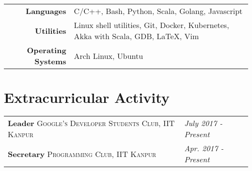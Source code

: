 \documentclass[11pt]{article}
\let\bold\textbf
\let\ital\textit
\let\smca\textsc
\begin{document}
\begin{tabular} {r l}
  \bold{Languages} & C/C++, Bash, Python, Scala, Golang, Javascript \\
  \bold{Utilities} & Linux shell utilities, Git, Docker, Kubernetes, Akka with Scala, GDB, \LaTeX, Vim \\
  \bold{Operating Systems} & Arch Linux, Ubuntu \\
\end{tabular}

\section*{{\selectfont Ext}racurricular Activity\color{gray}\hrulefill}

\begin{tabu} to \textwidth {l X[r]}
  \bold{Leader} {\footnotesize\smca{Google's Developer Students Club, IIT Kanpur}} & {\scriptsize{}\selectfont\ital{July 2017 - Present}} \\
  \bold{Secretary} {\footnotesize\smca{Programming Club, IIT Kanpur}} & {\scriptsize{}\selectfont\ital{Apr. 2017 - Present}} \\
\end{tabu}
\end{document}
